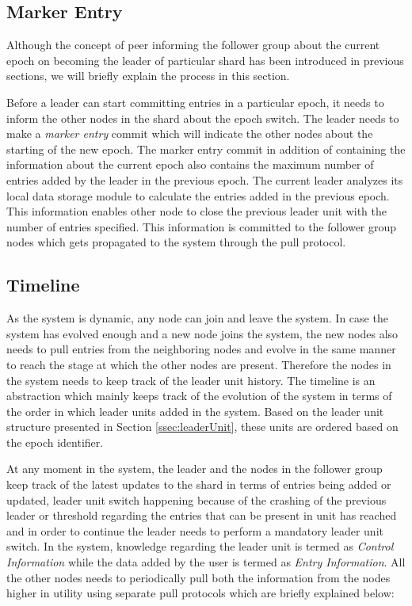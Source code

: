 \documentclass[12pt,a4paper,twoside,openright]{book}
\begin{document}
\subsection{Marker Entry}

Although the concept of peer informing the follower group about the current epoch on becoming the leader of particular shard has been introduced in previous sections, we will briefly explain the process in this section. 

\par Before a leader can start committing entries in a particular epoch, it needs to inform the other nodes in the shard about the epoch switch. The leader needs to make a \textit{marker entry} commit which will indicate the other nodes about the starting of the new epoch. The marker entry commit in addition of containing the information about the current epoch also contains the maximum number of entries added by the leader in the previous epoch. The current leader analyzes its local data storage module to calculate the entries added in the previous epoch. This information enables other node to close the previous leader unit with the number of entries specified. This information is committed to the follower group nodes which gets propagated to the system through the pull protocol.

\subsection{Timeline}
\label{ssec:timeline}

As the system is dynamic, any node can join and leave the system. In case the system has evolved enough and a new node joins the system, the new nodes also needs to pull entries from the neighboring nodes and evolve in the same manner to reach the stage at which the other nodes are present. Therefore the nodes in the system needs to keep track of the leader unit history. The timeline is an abstraction which mainly keeps track of the evolution of the system in terms of the order in which leader units added in the system. Based on the leader unit structure presented in Section \ref{ssec:leaderUnit}, these units are ordered based on the epoch identifier. 

\par At any moment in the system, the leader and the nodes in the follower group keep track of the latest updates to the shard in terms of entries being added or updated, leader unit switch happening because of the crashing of the previous leader or threshold regarding the entries that can be present in unit has reached and in order to continue the leader needs to perform a mandatory leader unit switch. In the system, knowledge regarding the leader unit is termed as \textit{Control Information} while the data added by the user is termed as \textit{Entry Information}. All the other nodes needs to periodically pull both the information from the nodes higher in utility using separate pull protocols which are briefly explained below:
\end{document}
